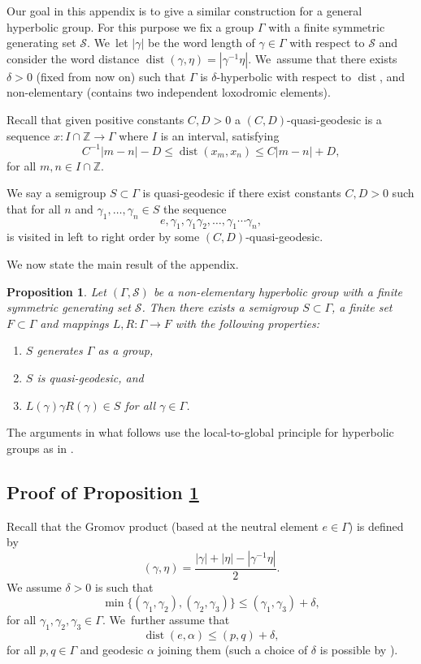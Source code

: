 \documentclass[10pt,a4paper]{amsart}
\newtheorem{proposition}[theorem]{Proposition}
\newcommand{\Z}{\mathbb{Z}}
\newcommand{\cS}{\mathcal{S}}
\DeclareMathOperator{\dist}{dist}
\begin{document}
Our goal in this appendix is to give a similar construction for a general hyperbolic group.
For this purpose we fix a group \(\Gamma\) with a finite symmetric generating set \(\cS\). We~let \(|\gamma|\) be the word length of \(\gamma \in \Gamma\) with respect to \(\cS\) and consider the word distance \(\dist(\gamma,\eta) = |\gamma^{-1}\eta|\). We~assume that there exists \(\delta > 0\) (fixed from now on) such that \(\Gamma\) is \(\delta\)-hyperbolic with respect to \(\dist\), and non-elementary (\ie contains two independent loxodromic elements).

Recall that given positive constants \(C,D > 0\) a \((C,D)\)-quasi-geodesic is a sequence \(x: I \cap \Z \to \Gamma\) where \(I\) is an interval, satisfying
\[
C^{-1}|m-n| - D \le \dist(x_m,x_n) \le C|m-n| + D,
\]
for all \(m,n \in I \cap \Z\).

We say a semigroup \(S \subset \Gamma\) is quasi-geodesic if there exist constants \(C,D > 0\) such that for all \(n\) and \(\gamma_1,\ldots, \gamma_n \in S\) the sequence
\[
e, \gamma_1,\gamma_1\gamma_2,\ldots, \gamma_1\cdots \gamma_n,
\]
is visited in left to right order by some \((C,D)\)-quasi-geodesic.

We now state the main result of the appendix.

\begin{proposition}\label{semigrouplemma}
Let \((\Gamma,\cS)\) be a non-elementary hyperbolic group with a finite symmetric generating set \(\cS\). Then there exists a semigroup \(S \subset \Gamma\), a finite set \(F \subset \Gamma\) and mappings \(L,R:\Gamma \to F\) with the following properties:
\begin{enumerate}
\item \(S\) generates \(\Gamma\) as a group,
\item \(S\) is quasi-geodesic, and
\item \(L(\gamma)\gamma R(\gamma) \in S\) for all \(\gamma \in \Gamma\).
\end{enumerate}
\end{proposition}

The arguments in what follows use the local-to-global principle for hyperbolic groups as in \cite[\S 3]{gouezel}.

\subsection{Proof of Proposition \ref{semigrouplemma}}

Recall that the Gromov product (based at the neutral element \(e \in \Gamma\)) is defined by
\[
(\gamma,\eta) = \frac{|\gamma| + |\eta| - |\gamma^{-1}\eta|}{2}.
\]
We assume \(\delta > 0\) is such that
\[
\min\lbrace (\gamma_1,\gamma_2),(\gamma_2,\gamma_3)\rbrace \le (\gamma_1,\gamma_3) + \delta,
\]
for all \(\gamma_1,\gamma_2,\gamma_3 \in \Gamma\). We~further assume that
\[
\dist(e,\alpha) \le (p,q) + \delta,
\]
for all \(p,q \in \Gamma\) and geodesic \(\alpha\) joining them (such a choice of \(\delta\) is possible by \cite[Prop.\,1.22]{bridson-haefliger}).
\end{document}
